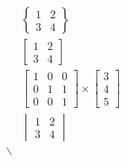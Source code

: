 \documentclass{article}
\begin{document}
	\begin{align}
		&\begin{Bmatrix}
			1 & 2\\
			3 & 4
		\end{Bmatrix}
		\\
		&\begin{bmatrix}
			1 & 2\\
			3 & 4
		\end{bmatrix}
		\\
		&\begin{bmatrix}
			1 & 0 & 0\\
			0 & 1 & 1\\
			0 & 0 & 1
		\end{bmatrix}
		\times
		\begin{bmatrix}
			3\\
			4\\
			5
		\end{bmatrix}
		\\
		&\begin{vmatrix}
			1 & 2\\
			3 & 4
		\end{vmatrix}
		\\
		\backslash
	\end{align}
\end{document}
